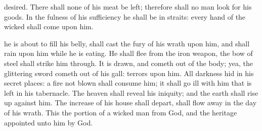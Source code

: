 {desired.
There shall none of his
meat be
left; therefore shall no man
look for his
goods.
In the
fulness of his
sufficiency he shall be in
straits: every
hand of the
wicked shall
come upon him.
\par }{\PP {} he is about to
fill his
belly,
{} shall
cast the
fury of his
wrath upon him, and shall
rain
{} upon him while he is
eating.
He shall
flee from the
iron
weapon,
{} the
bow of
steel shall strike him
through.
It is
drawn, and cometh
out of the
body; yea, the glittering
sword cometh
out of his
gall:
terrors
{} upon him.
All
darkness
{}
hid in his secret
places: a
fire not
blown shall
consume him; it shall go
ill with him that is
left in his
tabernacle.
The
heaven shall
reveal his
iniquity; and the
earth shall rise
up against him.
The
increase of his
house shall
depart,
{} shall flow
away in the
day of his
wrath.
This
{} the
portion of a
wicked
man from
God, and the
heritage
appointed unto him by
God.

}
